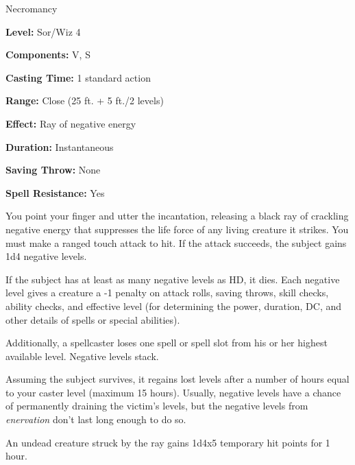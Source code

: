 
Necromancy

\textbf{Level:} Sor/Wiz 4

\textbf{Components:} V, S

\textbf{Casting Time:} 1 standard action

\textbf{Range:} Close (25 ft. + 5 ft./2 levels)

\textbf{Effect:} Ray of negative energy

\textbf{Duration:} Instantaneous

\textbf{Saving Throw:} None

\textbf{Spell Resistance:} Yes

You point your finger and utter the incantation, releasing a black ray of crackling 
negative energy that suppresses the life force of any living creature it strikes. 
You must make a ranged touch attack to hit. If the attack succeeds, the subject 
gains 1d4 negative levels.

If the subject has at least as many negative levels as HD, it dies. Each negative 
level gives a creature a -1 penalty on attack rolls, saving throws, skill checks, 
ability checks, and effective level (for determining the power, duration, DC, and 
other details of spells or special abilities).

Additionally, a spellcaster loses one spell or spell slot from his or her highest 
available level. Negative levels stack.

Assuming the subject survives, it regains lost levels after a number of hours equal 
to your caster level (maximum 15 hours). Usually, negative levels have a chance 
of permanently draining the victim's levels, but the negative levels from \textit{enervation 
}don't last long enough to do so.

An undead creature struck by the ray gains 1d4x5 temporary hit points for 1 hour.

